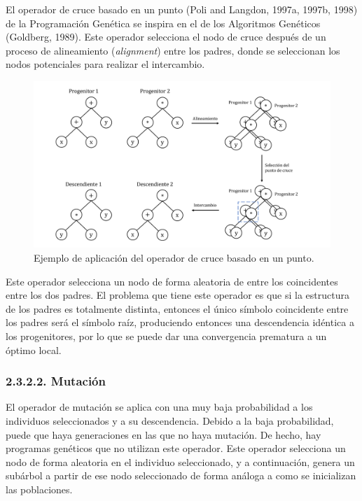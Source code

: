 \documentclass[spanish,a4paper,12pt,twoside]{report}
\begin{document}
        \subsubsection*{\vspace{-0.5cm}{\normalsize Operador basado en un punto}}
        \vspace{-0.5cm}
        El operador de cruce basado en un punto (Poli and Langdon, 1997a, 1997b, 1998) de la Programación Genética se inspira en el de los Algoritmos Genéticos (Goldberg, 1989). Este operador selecciona el nodo de cruce después de un proceso de alineamiento (\emph{alignment}) entre los padres, donde se seleccionan los nodos potenciales para realizar el intercambio.
        \begin{figure}[H]
          \centering
          \includegraphics[width = 1\textwidth]{resources/Fig4.pdf}
          \caption{Ejemplo de aplicación del operador de cruce basado en un punto.}
          \label{fig:4}
        \end{figure} \par
        Este operador selecciona un nodo de forma aleatoria de entre los coincidentes entre los dos padres. El problema que tiene este operador es que si la estructura de los padres es totalmente distinta, entonces el único símbolo coincidente entre los padres será el símbolo raíz, produciendo entonces una descendencia idéntica a los progenitores, por lo que se puede dar una convergencia prematura a un óptimo local.
        
      \subsubsection*{\normalsize 2.3.2.2. Mutación}
      El operador de mutación se aplica con una muy baja probabilidad a los individuos seleccionados y a su descendencia. Debido a la baja probabilidad, puede que haya generaciones en las que no haya mutación. De hecho, hay programas genéticos que no utilizan este operador. Este operador selecciona un nodo de forma aleatoria en el individuo seleccionado, y a continuación, genera un subárbol a partir de ese nodo seleccionado de forma análoga a como se inicializan las poblaciones.
\end{document}
